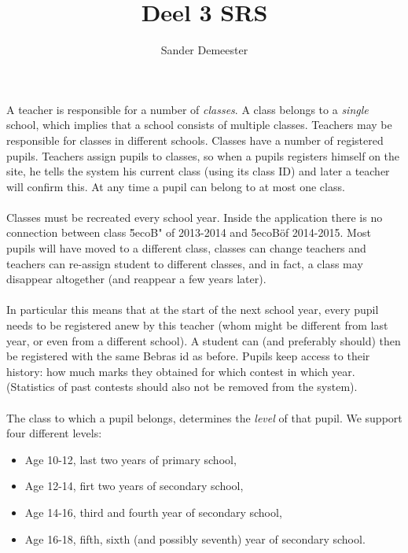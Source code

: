 \documentclass[10pt,a4paper]{report}
\author{Sander Demeester}
\title{Deel 3 SRS}
\begin{document}
A teacher is responsible for a number of \emph{classes}. A class belongs to a \emph{single} school, which implies that a school consists of multiple classes. Teachers may be responsible for classes in different schools. Classes have a number of registered pupils. Teachers assign pupils to classes, so when a pupils registers himself on the site, he tells the system his current class (using its class ID) and later a teacher will confirm this. At any time a pupil can belong to at most one class. \\
\\
Classes must be recreated every school year. Inside the application there is no connection between class \"5ecoB" of 2013-2014 and \"5ecoB\" of 2014-2015. Most pupils will have moved to a different class, classes can change teachers and teachers can re-assign student to different classes, and in fact, a class may disappear altogether (and reappear a few years later).\\
\\
In particular this means that at the start of the next school year, every pupil needs to be registered anew by this teacher (whom might be different from last year, or even from a different school). A student can (and preferably should) then be registered with the same Bebras id as before. Pupils keep access to their history: how much marks they obtained for which contest in which year. \\
(Statistics of past contests should also not be removed from the system).\\
\\
The class to which a pupil belongs, determines the \emph{level} of that pupil. We support four different levels:
\begin{itemize}
\item Age 10-12, last two years of primary school,
\item Age 12-14, firt two years of secondary school,
\item Age 14-16, third and fourth year of secondary school,
\item Age 16-18, fifth, sixth (and possibly seventh) year of secondary school.
\end{itemize}
\end{document}
